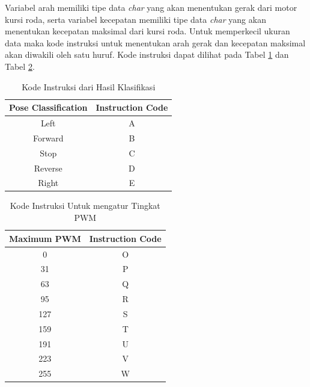 Variabel arah memiliki tipe data \emph{char} yang akan menentukan gerak dari motor kursi roda, serta variabel kecepatan memiliki tipe data \emph{char} yang akan menentukan kecepatan maksimal dari kursi roda. Untuk memperkecil ukuran data maka kode instruksi untuk menentukan arah gerak dan kecepatan maksimal akan diwakili oleh satu huruf. Kode instruksi dapat dilihat pada Tabel \ref{tbl:kode-instruksi} dan Tabel \ref{tbl:kodePWM}. 

\begin{table}[h]
  \centering
      \caption{Kode Instruksi dari Hasil Klasifikasi}
      \label{tbl:kode-instruksi}
      \begin{tabular}{|c|c|}
          \hline
          Pose Classification & Instruction Code \\ \hline
          Left             & A              \\ \hline
          Forward             & B              \\ \hline
          Stop             & C              \\ \hline
          Reverse           & D              \\ \hline
          Right            & E              \\ \hline
      \end{tabular}
\end{table}


\begin{table}[!ht]
  \centering
  \caption{Kode Instruksi Untuk mengatur Tingkat PWM}
  \label{tbl:kodePWM}
  \begin{tabular}{|c|c|}
  \hline
  Maximum PWM & Instruction Code \\ \hline
  0           & O                \\ \hline
  31          & P                \\ \hline
  63          & Q                \\ \hline
  95          & R                \\ \hline
  127         & S                \\ \hline
  159         & T                \\ \hline
  191         & U                \\ \hline
  223         & V                \\ \hline
  255         & W                \\ \hline
  \end{tabular}
\end{table}

